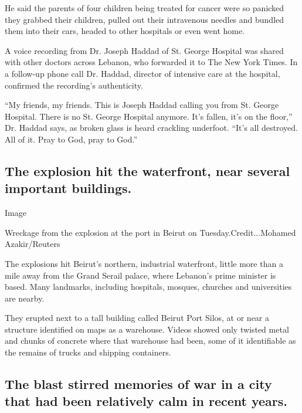 He said the parents of four children being treated for cancer were so
panicked they grabbed their children, pulled out their intravenous
needles and bundled them into their cars, headed to other hospitals or
even went home.

A voice recording from Dr. Joseph Haddad of St. George Hospital was
shared with other doctors across Lebanon, who forwarded it to The New
York Times. In a follow-up phone call Dr. Haddad, director of intensive
care at the hospital, confirmed the recording's authenticity.

``My friends, my friends. This is Joseph Haddad calling you from St.
George Hospital. There is no St. George Hospital anymore. It's fallen,
it's on the floor,'' Dr. Haddad says, as broken glass is heard crackling
underfoot. ``It's all destroyed. All of it. Pray to God, pray to God.''

\hypertarget{the-explosion-hit-the-waterfront-near-several-important-buildings}{%
\subsection{The explosion hit the waterfront, near several important
buildings.}\label{the-explosion-hit-the-waterfront-near-several-important-buildings}}

Image

Wreckage from the explosion at the port in Beirut on
Tuesday.Credit...Mohamed Azakir/Reuters

The explosions hit Beirut's northern, industrial waterfront, little more
than a mile away from the Grand Serail palace, where Lebanon's prime
minister is based. Many landmarks, including hospitals, mosques,
churches and universities are nearby.

They erupted next to a tall building called Beirut Port Silos, at or
near a structure identified on maps as a warehouse. Videos showed only
twisted metal and chunks of concrete where that warehouse had been, some
of it identifiable as the remains of trucks and shipping containers.

\hypertarget{the-blast-stirred-memories-of-war-in-a-city-that-had-been-relatively-calm-in-recent-years}{%
\subsection{The blast stirred memories of war in a city that had been
relatively calm in recent
years.}\label{the-blast-stirred-memories-of-war-in-a-city-that-had-been-relatively-calm-in-recent-years}}

